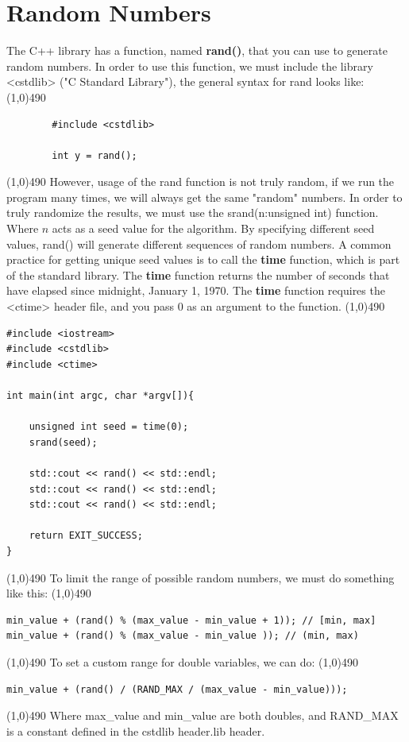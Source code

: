 \documentclass{report}
\begin{document}
    \section{\LARGE Random Numbers}
    \bigbreak \noindent 
    The C++ library has a function, named \textbf{rand()}, that you can use to generate random numbers. In order to use this function, we must include the library <cstdlib> ("C Standard Library"), the general syntax for rand looks like:
    \smallbreak \noindent
    \line(1,0){490}
    \begin{verbatim}
        #include <cstdlib>
        
        int y = rand();
    \end{verbatim}
    \line(1,0){490}
    \bigbreak \noindent 
    However, usage of the rand function is not truly random, if we run the program many times, we will always get the same "random" numbers. In order to truly randomize the results, we must use the srand(n:unsigned int) function. Where $n$ acts as a seed value for the algorithm. By specifying different seed values, rand() will generate different sequences of random numbers.
    \bigbreak \noindent 
    A common practice for getting unique seed values is to call the \textbf{time} function, which is part of the standard library. The \textbf{time} function returns the number of seconds that have elapsed since midnight, January 1, 1970. The \textbf{time} function requires the <ctime> header file, and you pass 0 as an argument to the function.
    \smallbreak \noindent
    \line(1,0){490}
    \begin{verbatim}
#include <iostream>
#include <cstdlib>
#include <ctime>

int main(int argc, char *argv[]){

    unsigned int seed = time(0);
    srand(seed);

    std::cout << rand() << std::endl; 
    std::cout << rand() << std::endl; 
    std::cout << rand() << std::endl; 

    return EXIT_SUCCESS;
}
    \end{verbatim}
    \line(1,0){490}
    \bigbreak \noindent 
    To limit the range of possible random numbers, we must do something like this:
    \smallbreak \noindent
    \line(1,0){490}
    \begin{verbatim} 
min_value + (rand() % (max_value - min_value + 1)); // [min, max]
min_value + (rand() % (max_value - min_value )); // (min, max)
    \end{verbatim}
    \line(1,0){490}
    \bigbreak \noindent 
    To set a custom range for double variables, we can do:
    \bigbreak \noindent 
    \line(1,0){490}
    \begin{verbatim}
min_value + (rand() / (RAND_MAX / (max_value - min_value)));
    \end{verbatim}
    \line(1,0){490}
    \bigbreak \noindent 
    Where max\_value and min\_value are both doubles, and RAND\_MAX is a constant defined in the cstdlib header.lib header.
\end{document}
